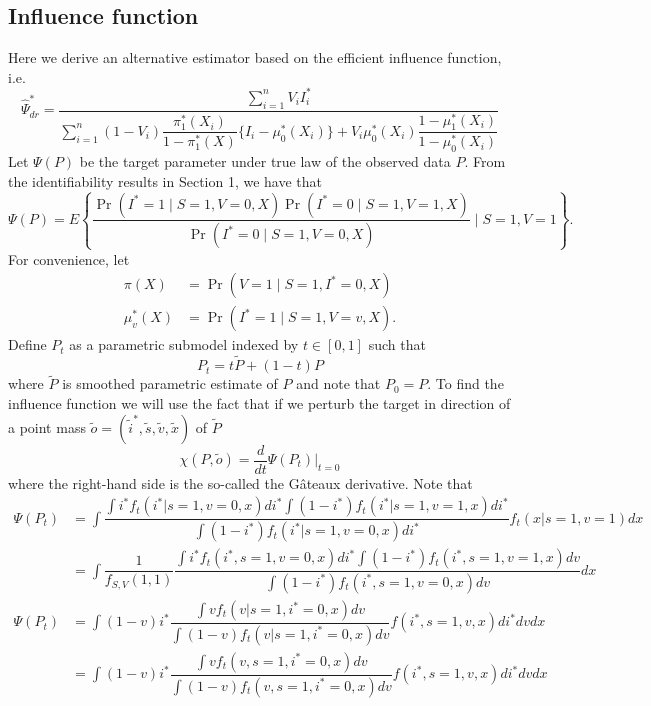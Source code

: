 \documentclass{article}
\begin{document}
\subsection{Influence function}
Here we derive an alternative estimator based on the efficient influence function, i.e. 
\begin{equation}
    \widehat{\Psi}_{dr}^* = \dfrac{\sum_{i=1}^n V_i I^*_i}{\sum_{i=1}^n (1 - V_i)\dfrac{\pi^*_1(X_i)}{1 - \pi^*_1(X)} \{I_i - \mu^*_0(X_i) \} + V_i \mu^*_0(X_i)\dfrac{1 - \mu^*_1(X_i)}{1 - \mu^*_0(X_i)}}
\end{equation}
Let $\Psi(P)$ be the target parameter under true law of the observed data $P$. From the identifiability results in Section 1, we have that 
$$\Psi(P) = E\left\{\dfrac{\Pr(I^*=1\mid S=1, V=0, X)\Pr(I^*=0\mid S=1, V=1, X)}{\Pr(I^*=0\mid S=1, V=0, X)}\mid S=1, V=1\right\}.$$ 
For convenience, let
\begin{align*}
    \pi(X) &= \Pr(V=1\mid S=1, I^*=0, X) \\
    \mu^*_v(X) &= \Pr(I^*=1\mid S=1, V=v, X).
\end{align*}
Define $P_t$ as a parametric submodel indexed by $t \in [0,1]$ such that
$$P_t = t \widetilde{P} + (1 - t)P$$
where $\widetilde{P}$ is smoothed parametric estimate of $P$ and note that $P_0 = P$. To find the influence function we will use the fact that if we perturb the target in direction of a point mass $\widetilde{o} = (\widetilde{i}^*, \widetilde{s}, \widetilde{v}, \widetilde{x})$ of $\widetilde{P}$
$$ \chi(P, \widetilde{o}) = \frac{d}{dt} \Psi(P_t)\bigg\vert_{t=0}$$
where the right-hand side is the so-called the G\^{a}teaux derivative. Note that 
\begin{align*}
    \Psi(P_t) &= \int \dfrac{\int i^* f_t(i^* | s=1,v=0,x)di^* \int (1-i^*) f_t(i^* | s=1, v=1, x)di^*}{\int(1 - i^*) f_t(i^* | s=1, v=0, x)di^*}f_t(x|s=1,v=1)dx \\
    &= \int \dfrac{1}{f_{S,V}(1, 1)} \dfrac{\int i^* f_t(i^*, s=1,v=0,x)di^* \int (1 - i^*)  f_t(i^*, s=1, v=1, x)dv}{\int(1 - i^*)  f_t(i^*, s=1, v=0, x)dv}dx 
\end{align*}
\begin{align*}
    \Psi(P_t) &= \int (1 - v)i^*\dfrac{\int v f_t(v | s=1, i^*=0, x)dv}{\int (1-v) f_t(v | s=1, i^*=0, x)dv} f(i^*, s=1, v, x) di^* dv dx \\
    &= \int (1 - v)i^*\dfrac{\int v f_t(v, s=1, i^*=0, x)dv}{\int (1-v) f_t(v, s=1, i^*=0, x)dv} f(i^*, s=1, v, x) di^* dv dx
\end{align*}
\end{document}
